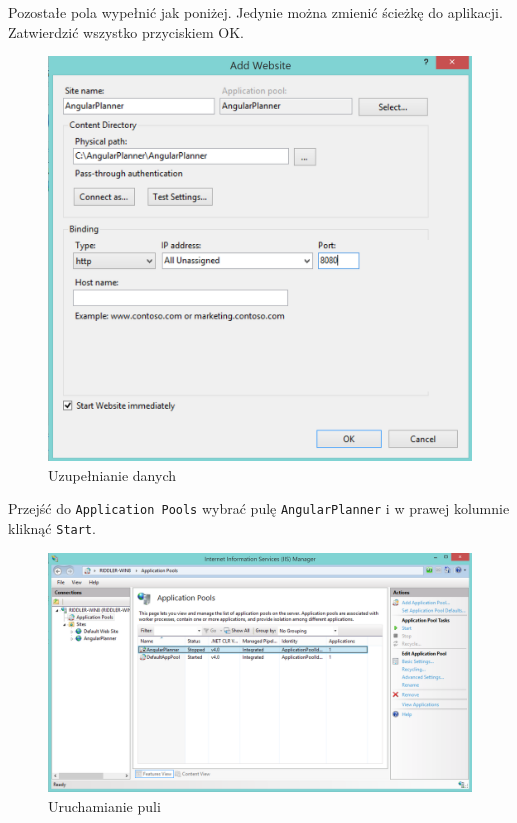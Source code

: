 \documentclass[10pt,titlepage]{article}
\begin{document}
\par Pozostałe pola wypełnić jak poniżej. Jedynie można zmienić ścieżkę do aplikacji. Zatwierdzić wszystko przyciskiem OK.
\begin{figure}[H]
  \centering
  \includegraphics[scale=0.35]{images/install10.png}
  \caption{Uzupełnianie danych}
\end{figure}
\par Przejść do \verb|Application Pools| wybrać pulę \verb|AngularPlanner| i w prawej kolumnie kliknąć \verb|Start|.
\begin{figure}[H]
  \centering
  \includegraphics[scale=0.35]{images/install11.png}
  \caption{Uruchamianie puli}
\end{figure}
\end{document}
